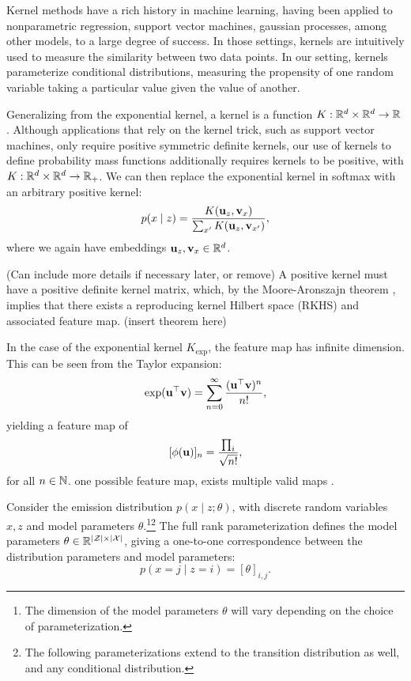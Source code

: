 \documentclass{article}
\newcommand\Kexp{K_\textrm{exp}}
\begin{document}
Kernel methods have a rich history in machine learning,
having been applied to nonparametric regression, support vector machines, gaussian processes,
among other models, to a large degree of success.
In those settings, kernels are intuitively used to measure the similarity between two data points.
In our setting, kernels parameterize conditional distributions,
measuring the propensity of one random variable taking a particular value given
the value of another.

Generalizing from the exponential kernel,
a kernel is a function $K: \mathbb{R}^d\times\mathbb{R}^d\to\mathbb{R}$.
Although applications that rely on the kernel trick, such as support vector machines,
only require positive symmetric definite kernels,
our use of kernels to define probability mass functions additionally requires
kernels to be positive, with $K: \mathbb{R}^d\times\mathbb{R}^d\to\mathbb{R}_+$.
We can then replace the exponential kernel in softmax with
an arbitrary positive kernel:
$$p(x \mid z) = \frac{K(\mathbf{u}_z, \mathbf{v}_x)}{\sum_{x'} K(\mathbf{u}_z, \mathbf{v}_{x'})},$$
where we again have embeddings $\mathbf{u}_z,\mathbf{v}_x\in\mathbb{R}^d$.

(Can include more details if necessary later, or remove)
A positive kernel must have a positive definite kernel matrix,
which, by the Moore-Aronszajn theorem \citep{aronszajn}, implies that there exists a 
reproducing kernel Hilbert space (RKHS) and associated feature map.
(insert theorem here)

In the case of the exponential kernel $\Kexp$, the feature map has infinite dimension.
This can be seen from the Taylor expansion:
$$\exp(\mathbf{u}^\top \mathbf{v}) = \sum_{n=0}^\infty \frac{(\mathbf{u}^\top \mathbf{v})^n}{n!},$$
yielding a feature map of 
$$[\phi(\mathbf{u})]_n = \frac{\prod_i}{\sqrt{n!}},$$
for all $n\in\mathbb{N}$.
one possible feature map, exists multiple valid maps
\citep{cotter2011gausskernel}.


Consider the emission distribution $p(x \mid z; \theta)$,
with discrete random variables $x,z$ and model parameters $\theta$.\footnote{
The dimension of the model parameters $\theta$ will vary depending on the choice
of parameterization.}\footnote{
The following parameterizations extend to the transition distribution as well,
and any conditional distribution.}
The full rank parameterization defines the model parameters $\theta\in\mathbb{R}^{|\mathcal{Z}|\times|\mathcal{X}|}$,
giving a one-to-one correspondence between the distribution parameters and model parameters:
$$p(x=j \mid z=i) = [\theta]_{i,j}.$$
\end{document}
